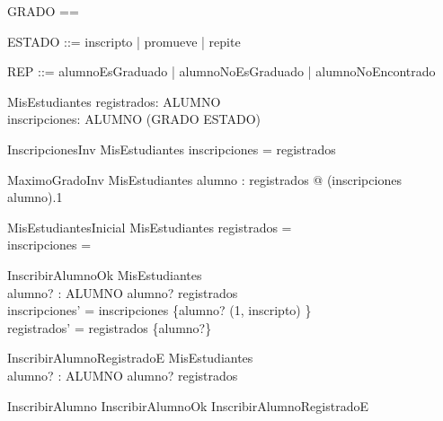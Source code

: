 \begin{zed}
    [ALUMNO]
\end{zed}
\begin{zed}
    GRADO == \nat
\end{zed}
\begin{zed}
    ESTADO ::= inscripto | promueve | repite
\end{zed}
\begin{zed}
    REP ::= alumnoEsGraduado | alumnoNoEsGraduado | alumnoNoEncontrado
\end{zed}

\begin{schema}{MisEstudiantes}
    registrados: \power ALUMNO \\
    inscripciones: ALUMNO \pfun (GRADO \cross ESTADO)
\end{schema}

\begin{schema}{InscripcionesInv}
    MisEstudiantes
    \where
    \dom inscripciones = registrados
\end{schema}

\begin{schema}{MaximoGradoInv}
    MisEstudiantes
    \where
    \forall alumno : registrados @ (inscripciones alumno).1 
\end{schema}

\begin{schema}{MisEstudiantesInicial}
    MisEstudiantes
    \where
    registrados = \emptyset \\
    inscripciones = \emptyset
\end{schema}

\begin{schema}{InscribirAlumnoOk}
    \Delta MisEstudiantes \\
    alumno? : ALUMNO
    \where
    alumno? \notin registrados \\
    inscripciones' = inscripciones \cup \{alumno? \mapsto (1, inscripto) \} \\
    registrados' = registrados \cup \{alumno?\}
\end{schema}

\begin{schema}{InscribirAlumnoRegistradoE}
    \Xi MisEstudiantes \\
    alumno? : ALUMNO
    \where
    alumno? \in registrados
\end{schema}

\begin{zed}
    InscribirAlumno  InscribirAlumnoOk \lor InscribirAlumnoRegistradoE
\end{zed}

